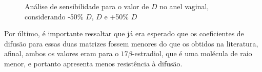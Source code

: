 \begin{figure}[!htb]
{        \label{fig:sensibilidade_anel_50}%
    }
    \caption[Análise de sensibilidade para o $D$ no anel vaginal]{Análise de sensibilidade para o valor de $D$ no anel vaginal, considerando  -50\% $D$,  $D$ e  +50\% $D$}
    \label{fig:sensibilidade_anel}
\end{figure}

Por último, é importante ressaltar que já era esperado que os coeficientes de difusão para essas duas matrizes fossem menores do que os obtidos na literatura, afinal, ambos os valores eram para o $17\beta$-estradiol, que é uma molécula de raio menor, e portanto apresenta menos resistência à difusão. 